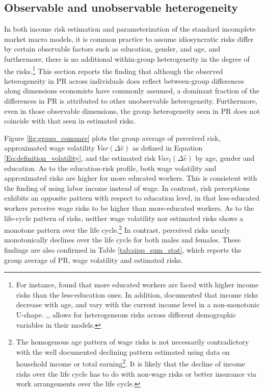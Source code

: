 
\hypertarget{cross-sectional-heterogeneity}{%
\subsection{Observable and unobservable
heterogeneity}\label{cross-sectional-heterogeneity}}

In both income risk estimation and parameterization of the standard incomplete market macro models, it is common practice to assume idiosyncratic risks differ by certain observable factors such as education, gender, and age, and furthermore, there is no additional within-group heterogeneity in the degree of the risks.\footnote{For instance, \cite{meghir2004income} found that more educated workers are faced with higher income risks than the less-education ones. In addition, \cite{sabelhaus2010great, bloom2018great} documented that income risks decrease with age, and vary with the current income level in a non-monotonic U-shape. \cite{cagetti2003wealth},\cite{blundell_consumption_2008}, \cite{carroll2017distribution} allows for heterogeneous risks across different demographic variables in their models.} This section reports the finding that although the observed heterogeneity in PR across individuals does reflect between-group differences along dimensions economists have commonly assumed, a dominant fraction of the differences in PR is attributed to other unobservable heterogeneity. Furthermore, even in those observable dimensions, the group heterogeneity seen in PR does not coincide with that seen in estimated risks.


Figure
\ref{fig:group_compare} plots the group average of perceived risk, approximated wage volatility $Var(\Delta \hat e)$ as defined in Equation \ref{Eq:definition_volatility}, and the estimated risk $Var_t(\Delta \hat e)$ by age, gender and education. As to the education-risk profile, both wage volatility and approximated risks are higher for more educated workers. This is consistent with the finding of \cite{meghir2004income} using labor income instead of wage. In contrast, risk perceptions exhibits an opposite pattern with respect to education level, in that less-educated workers perceive wage risks to be higher than more-educated workers. As to the life-cycle pattern of risks, neither wage volatility nor estimated risks shows a monotone pattern over the life cycle.\footnote{The homogenous age pattern of wage risks is not necessarily contradictory with the well documented declining pattern estimated using data on household income or total earning\footnote{For instance, \cite{cagetti2003wealth}, \cite{sabelhaus2010great}, etc.}. It is likely that the decline of income risks over the life cycle has to do with non-wage risks or better insurance via work arrangements over the life cycle. } In contrast, perceived risks nearly monotonically declines over the life cycle for both males and females. These findings are also confirmed in Table \ref{tab:sipp_sum_stat}, which reports the group average of PR, wage volatility and estimated risks. 

